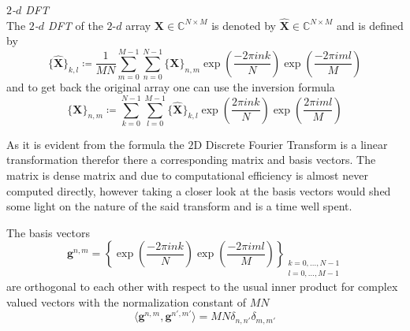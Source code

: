 \begin{Def}\label{def:2ddft}
    \emph{$2$-$d$ \ac{DFT}}\\
    The \emph{$2$-$d$ \ac{DFT}} of the $2$-$d$ array $\boldsymbol{X} \in \mathbb{C}^{N \times M}$ is denoted by 
    $\hat {\boldsymbol{X}} \in \mathbb{C}^{N \times M}$ and is defined by
    \begin{equation}\label{eq:2ddft}
        \{\hat {\boldsymbol{X}}\}_{k,l} \coloneqq \frac{1}{MN}\sum_{m=0}^{M-1}\sum_{n=0}^{N-1} \{{\boldsymbol{X}}\}_{n,m}\exp\left({\frac{-2\pi ink}{N}}\right)\exp\left({\frac{-2\pi iml}{M}}\right)
    \end{equation}
    and to get back the original array one can use the inversion formula
    \begin{equation}\label{eq:2didft}
        \{{\boldsymbol{X}}\}_{n,m} \coloneqq \sum_{k=0}^{N-1}\sum_{l=0}^{M-1}\{\hat {\boldsymbol{X}}\}_{k,l}\exp\left({\frac{2\pi ink}{N}}\right)\exp\left({\frac{2\pi iml}{M}}\right)
    \end{equation}    
\end{Def}

As it is evident from the formula the $2$D Discrete Fourier Transform is a linear transformation therefor 
there a corresponding matrix and basis vectors. The matrix is dense matrix and due to computational efficiency 
is almost never computed directly, however taking a closer look at the basis vectors would shed some light on 
the nature of the said transform and is a time well spent.





\begin{Prop}\label{Prop:2ddftbasisvectors}
    The basis vectors
    \begin{equation}\label{eq:2ddftbasisvectors}
        \boldsymbol{g}^{n,m} = \left\{\exp\left({\frac{-2\pi ink}{N}}\right)\exp\left({\frac{-2\pi iml}{M}}\right)\right\}_{\substack{k=0,\ldots,N-1\\l=0,\ldots,M-1}}
    \end{equation}
    are orthogonal to each other with respect to the usual inner product for complex valued vectors 
    with the normalization constant of $MN$
    \begin{equation}
        \langle\boldsymbol{g}^{n,m},\boldsymbol{g}^{n',m'}\rangle= MN \delta_{n,n'}\delta_{m,m'}
    \end{equation}
\end{Prop}

